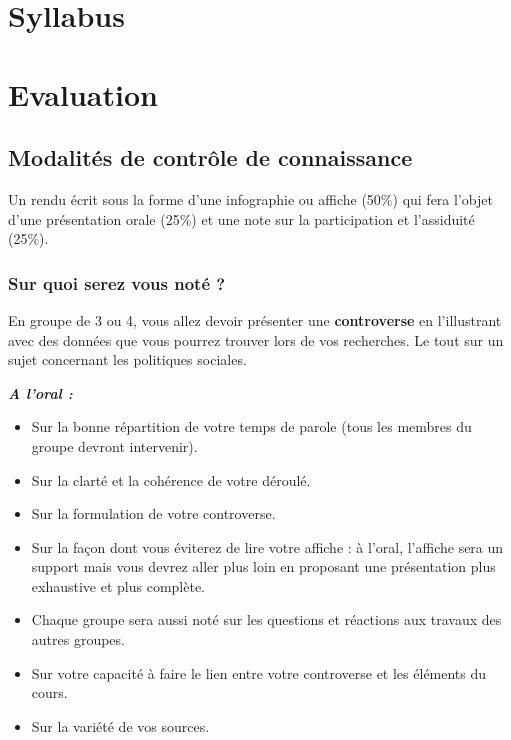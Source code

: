 \documentclass[
  letterpaper,
  DIV=11,
  numbers=noendperiod]{scrreprt}
\begin{document}

\hypertarget{syllabus}{%
\chapter{Syllabus}\label{syllabus}}


\hypertarget{evaluation}{%
\chapter{Evaluation}\label{evaluation}}

\hypertarget{modalituxe9s-de-contruxf4le-de-connaissance}{%
\section{Modalités de contrôle de
connaissance}\label{modalituxe9s-de-contruxf4le-de-connaissance}}

Un rendu écrit sous la forme d'une infographie ou affiche (50\%) qui
fera l'objet d'une présentation orale (25\%) et une note sur la
participation et l'assiduité (25\%).

\hypertarget{sur-quoi-serez-vous-notuxe9}{%
\subsection{Sur quoi serez vous noté
?}\label{sur-quoi-serez-vous-notuxe9}}

En groupe de 3 ou 4, vous allez devoir présenter une
\textbf{controverse} en l'illustrant avec des données que vous pourrez
trouver lors de vos recherches. Le tout sur un sujet concernant les
politiques sociales.

\textbf{\emph{A l'oral :}}

\begin{itemize}
\item
  Sur la bonne répartition de votre temps de parole (tous les membres du
  groupe devront intervenir).
\item
  Sur la clarté et la cohérence de votre déroulé.
\item
  Sur la formulation de votre controverse.
\item
  Sur la façon dont vous éviterez de lire votre affiche : à l'oral,
  l'affiche sera un support mais vous devrez aller plus loin en
  proposant une présentation plus exhaustive et plus complète.
\item
  Chaque groupe sera aussi noté sur les questions et réactions aux
  travaux des autres groupes.
\item
  Sur votre capacité à faire le lien entre votre controverse et les
  éléments du cours.
\item
  Sur la variété de vos sources.
\end{itemize}
\end{document}
